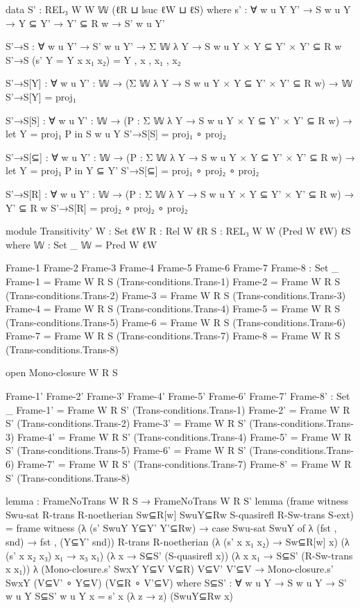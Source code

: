 \begin{spverbatim}
  data S' : REL₃ W W 𝕎 (ℓR ⊔ lsuc ℓW ⊔ ℓS) where
    s' : ∀ {w u Y Y'} → S w u Y → Y ⊆ Y' → Y' ⊆ R w → S' w u Y'

  S'→S : ∀ {w u Y'} → S' w u Y' → Σ 𝕎 λ Y → S w u Y × Y ⊆ Y' × Y' ⊆ R w
  S'→S (s' {Y = Y} x x₁ x₂) = Y , x , x₁ , x₂

  S'→S[Y] : ∀ {w u} {Y' : 𝕎} → (Σ 𝕎 λ Y → S w u Y × Y ⊆ Y' × Y' ⊆ R w) → 𝕎
  S'→S[Y] = proj₁

  S'→S[S] : ∀ {w u} {Y' : 𝕎} → (P : Σ 𝕎 λ Y → S w u Y × Y ⊆ Y' × Y' ⊆ R w) → let Y = proj₁ P in S w u Y
  S'→S[S] = proj₁ ∘ proj₂

  S'→S[⊆] : ∀ {w u} {Y' : 𝕎} → (P : Σ 𝕎 λ Y → S w u Y × Y ⊆ Y' × Y' ⊆ R w) → let Y = proj₁ P in Y ⊆ Y'
  S'→S[⊆] = proj₁ ∘ proj₂ ∘ proj₂

  S'→S[R] : ∀ {w u} {Y' : 𝕎} → (P : Σ 𝕎 λ Y → S w u Y × Y ⊆ Y' × Y' ⊆ R w) → Y' ⊆ R w
  S'→S[R] = proj₂ ∘ proj₂ ∘ proj₂

module Transitivity'
  {W : Set ℓW}
  {R : Rel W ℓR}
  {S : REL₃ W W (Pred W ℓW) ℓS}
  where
  𝕎 : Set _
  𝕎 = Pred W ℓW

  Frame-1 Frame-2 Frame-3 Frame-4 Frame-5 Frame-6 Frame-7 Frame-8
    : Set _
  Frame-1 = Frame W R S (Trans-conditions.Trans-1)
  Frame-2 = Frame W R S (Trans-conditions.Trans-2)
  Frame-3 = Frame W R S (Trans-conditions.Trans-3)
  Frame-4 = Frame W R S (Trans-conditions.Trans-4)
  Frame-5 = Frame W R S (Trans-conditions.Trans-5)
  Frame-6 = Frame W R S (Trans-conditions.Trans-6)
  Frame-7 = Frame W R S (Trans-conditions.Trans-7)
  Frame-8 = Frame W R S (Trans-conditions.Trans-8)

  open Mono-closure W R S

  Frame-1' Frame-2' Frame-3' Frame-4' Frame-5' Frame-6' Frame-7' Frame-8'
    : Set _
  Frame-1' = Frame W R S' (Trans-conditions.Trans-1)
  Frame-2' = Frame W R S' (Trans-conditions.Trans-2)
  Frame-3' = Frame W R S' (Trans-conditions.Trans-3)
  Frame-4' = Frame W R S' (Trans-conditions.Trans-4)
  Frame-5' = Frame W R S' (Trans-conditions.Trans-5)
  Frame-6' = Frame W R S' (Trans-conditions.Trans-6)
  Frame-7' = Frame W R S' (Trans-conditions.Trans-7)
  Frame-8' = Frame W R S' (Trans-conditions.Trans-8)

  lemma : FrameNoTrans W R S → FrameNoTrans W R S'
  lemma (frame witness Swu-sat R-trans R-noetherian Sw⊆R[w]
    SwuY⊆Rw S-quasirefl R-Sw-trans S-ext) =
    frame witness
      (λ { (s' SwuY Y⊆Y' Y'⊆Rw) → case Swu-sat SwuY of λ { (fst , snd) → fst , (Y⊆Y' snd)}})
      R-trans
      R-noetherian
      (λ { (s' x x₁ x₂) → Sw⊆R[w] x})
      (λ { (s' x x₂ x₃) x₁ → x₃ x₁})
      (λ x → S⊆S' (S-quasirefl x))
      (λ {x x₁ → S⊆S' (R-Sw-trans x x₁)})
      λ { (Mono-closure.s' SwxY Y⊆V V⊆R) V⊆V' V'⊆V →
        Mono-closure.s' SwxY (V⊆V' ∘ Y⊆V) (V⊆R ∘ V'⊆V)}
      where
      S⊆S' : ∀ {w u Y} → S w u Y → S' w u Y
      S⊆S' {w} {u} {Y} x = s' x (λ z → z) (SwuY⊆Rw x)


\end{spverbatim}
